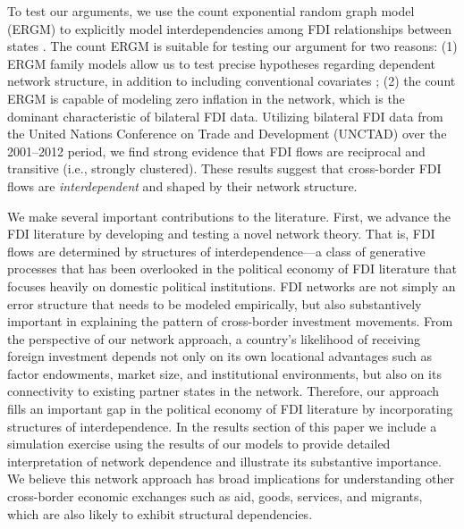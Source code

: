 \documentclass[reqno,onecolumn,letterpaper,12pt]{article}
\begin{document}
To test our arguments, we use the count exponential random graph model (ERGM) to explicitly model interdependencies among FDI relationships between states \citep{krivitsky2012exponential}. The count ERGM is suitable for testing our argument for two reasons: (1) ERGM family models allow us to test precise hypotheses regarding dependent network structure, in addition to including conventional covariates \citep{cranmer2016critique,desmarais2017statistical}; (2) the count ERGM is capable of modeling zero inflation in the network, which is the dominant characteristic of bilateral FDI data. Utilizing bilateral FDI data from the United Nations Conference on Trade and Development (UNCTAD) over the 2001--2012 period, we find strong evidence that FDI flows are reciprocal and transitive (i.e., strongly clustered). These results suggest that cross-border FDI flows are \textit{interdependent} and shaped by their network structure. %

We make several important contributions to the literature. First, we advance the FDI literature by developing and testing a novel network theory. That is, FDI flows are determined by structures of interdependence---a class of generative processes that has been overlooked in the political economy of FDI literature that focuses heavily on domestic political institutions. %
FDI networks are not simply an error structure that needs to be modeled empirically, but also substantively important in explaining the pattern of cross-border investment movements. From the perspective of our network approach, a country's likelihood of receiving foreign investment depends not only on its own locational advantages such as factor endowments, market size, and institutional environments, but also on its connectivity to existing partner states in the network. Therefore, our approach fills an important gap in the political economy of FDI literature by incorporating structures of interdependence. In the results section of this paper we include a simulation exercise using the results of our models to provide detailed interpretation of network dependence and illustrate its substantive importance. We believe this network approach has broad implications for understanding other cross-border economic exchanges such as aid, goods, services, and migrants, which are also likely to exhibit structural dependencies. %
\end{document}
